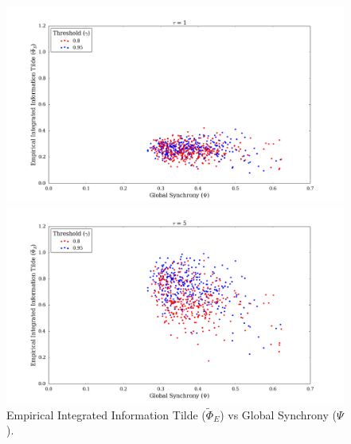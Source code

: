 \documentclass[a4paper,11pt]{article}
\begin{document}
\begin{figure}[H] 
	\begin{minipage}[b]{0.5\linewidth}
		\begin{center}
		\includegraphics[scale = 0.2]{figures/snn/phi_tilde_vs_psi_1}
		\end{center}
		\vspace{4ex}
	\end{minipage}
	\begin{minipage}[b]{0.5\linewidth}
		\begin{center}
		\includegraphics[scale = 0.2]{figures/snn/phi_tilde_vs_psi_5}
		\end{center}
		\vspace{4ex}
	\end{minipage}
	\caption{
		Empirical Integrated Information Tilde ($\widetilde{\Phi}_E$) vs Global Synchrony ($\Psi$).
		\label{fig:phi_tilde_vs_psi}
	}
\end{figure}

\end{document}

